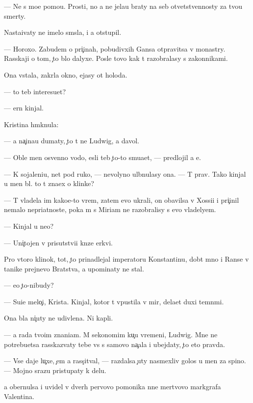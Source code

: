 \documentclass[10pt]{book}
\begin{document}
— Ne s mo{\y}e{\y} pomo{\x}{\y}u. Prosti, no {\y}a ne jela{\y}u braty na seb{\ia} otvetstvennosty za tvo{\y}u smerty.

Nasta{\y}ivaty ne imelo sm{\yi}sla, i {\y}a otstupil.

— Horoxo. Zabudem o pri{\c}inah, pobudivxih Gansa otpravitsa v monast{\yi}ry. Rasskaji o tom, {\c}to b{\yi}lo dalyxe. Posle tovo kak t{\yi} razobralasy s zakonnikami.

Ona vstala, zakr{\yi}la okno, {\y}ejasy ot holoda.

— {\C}to teb{\ia} interesu{\y}et?

— {\C}ern{\yi}{\y} kinjal.

Kristina hm{\yi}knula:

— {\Y}a na{\c}ina{\y}u dumaty, {\c}to t{\yi} ne Ludwig, a d{\y}avol.

— Oble{\y} men{\ia} osv{\ia}{\x}enno{\y} vodo{\y}, {\y}esli teb{\ia} {\c}to-to smu{\x}a{\y}et, — predlojil {\y}a {\y}e{\y}.

— K sojaleni{\y}u, net pod ruko{\y}, — nevolyno ul{\yi}bnulasy ona. — T{\yi} prav. Tako{\y} kinjal u men{\ia} b{\yi}l. {\C}to t{\yi} zna{\y}ex o klinke?

— T{\yi} vladela im kako{\y}e-to vrem{\ia}, zatem {\y}evo ukrali, on ob{\y}avilsa v Xossi{\y}i i pri{\c}inil nemalo nepri{\y}atnoste{\y}, poka m{\yi} s Miriam ne razobralisy s {\y}evo vladely{\q}em.

— Kinjal u ne{\y}o?

— Uni{\c}tojen v prisutstvi{\y}i kn{\ia}ze{\y} {\Q}erkvi.

Pro vtoro{\y} klinok, tot, {\c}to prinadlejal imperatoru Konstantinu, dob{\yi}t{\yi}{\y} mno{\y} i Ranse v ta{\y}nike prejnevo Bratstva, {\y}a upominaty ne stal.

— {\y}e{\x}o {\c}to-nibudy?

— Su{\x}i{\y}e melo{\c}i, Krista. Kinjal, kotor{\yi}{\y} t{\yi} v{\yi}pustila v mir, dela{\y}et duxi temn{\yi}mi.

Ona b{\yi}la ni{\c}uty ne udivlena. Ni kapli.

— {\Y}a rada tvo{\y}im znani{\y}am. M{\yi} sekonomim ku{\c}u vremeni, Ludwig. Mne ne potrebu{\y}etsa rasskaz{\yi}vaty tebe vs{\e} s samovo na{\c}ala i ubejdaty, {\c}to eto pravda.

— Vse daje lu{\c}xe, {\c}em {\y}a rass{\c}it{\yi}val, — razdalsa {\c}uty nasmexliv{\yi}{\y} golos u men{\ia} za spino{\y}. — Mojno srazu pristupaty k delu.

{\Y}a obernulsa i uvidel v dver{\ia}h pervovo pomo{\x}nika n{\yi}ne mertvovo markgrafa Valentina.
\end{document}

